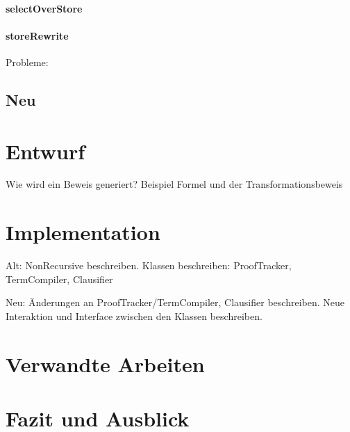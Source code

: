 \documentclass[a4paper]{article}
\begin{document}
\paragraph{selectOverStore}
\paragraph{storeRewrite}

Probleme:

\subsection{Neu}

\section{Entwurf}

Wie wird ein Beweis generiert?
Beispiel Formel und der Transformationsbeweis

\section{Implementation}

Alt:
NonRecursive beschreiben.
Klassen beschreiben: ProofTracker, TermCompiler, Clausifier

Neu:
Änderungen an ProofTracker/TermCompiler, Clausifier beschreiben.
Neue Interaktion und Interface zwischen den Klassen beschreiben.


\section{Verwandte Arbeiten}

\section{Fazit und Ausblick}


\end{document}
